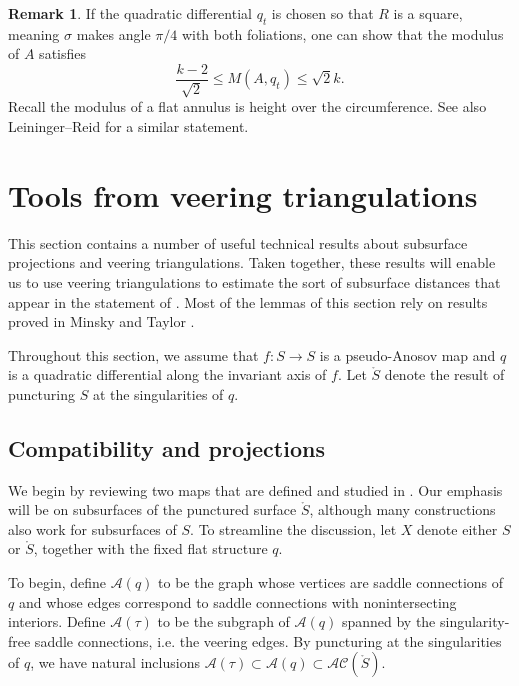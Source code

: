 \documentclass[11pt,letterpaper]{amsart}
\newcommand{\A}[0]{\mathcal{A}}
\newcommand{\mc}{\mathcal}
\newcommand{\mr}{\mathring}
\numberwithin{equation}{section}
\theoremstyle{definition}
\newtheorem{remark}[theorem]{Remark}
\newcommand{\AC}{\mathcal{AC}}
\newcommand{\from}{\colon} %
\begin{document}
\begin{remark}
If the quadratic differential $q_t$ is chosen so that $R$ is a square, meaning $\sigma$ makes angle $\pi/4$ with both foliations, one can show that the modulus of $A$ satisfies
\[
\frac{k-2}{\sqrt{2}} \leq M(A, q_t) \leq \sqrt{2} k.
\]
Recall the modulus of a flat annulus is height over the circumference.
See also Leininger--Reid \cite[Proposition 3.1]{leininger2020pseudo} for a similar statement.
\end{remark}

\medskip

\section{Tools from veering triangulations}\label{Sec:Tools}
This section contains a number of useful technical results about subsurface projections and veering triangulations. Taken together, these results will enable us to use veering triangulations to estimate the sort of subsurface distances that appear in the statement of .
Most of the lemmas of this section rely on results proved in Minsky and Taylor \cite{MinskyTaylor:FiberedFaces, MinskyTaylor:SubsurfaceDist}.

Throughout this section, we assume that $f \from S \to S$ is a pseudo-Anosov map and $q$ is a quadratic differential along the invariant axis of $f$. Let $\mr S$ denote the result of puncturing $S$ at the singularities of $q$.

\subsection{Compatibility and projections}\label{Sec:Compatibility}

We begin by reviewing two maps that are defined and studied in \cite{MinskyTaylor:FiberedFaces}. Our emphasis will be on subsurfaces of the punctured surface $\mr S$, although many constructions also work for subsurfaces of $S$. To streamline the discussion, let $X$ denote either $S$ or $\mr S$, together with the fixed flat structure $q$.

To begin, define $\A(q)$ to be the graph whose vertices are saddle connections of $q$ and whose edges correspond to saddle connections with nonintersecting interiors. Define $\mc A(\tau)$ to be the subgraph of $\A(q)$ spanned by the singularity-free saddle connections, i.e. the veering edges. By puncturing at the singularities of $q$, we have natural inclusions $\A(\tau) \subset \mc A(q) \subset \AC(\mr S)$.
\end{document}
